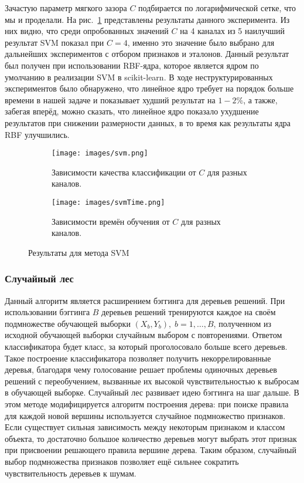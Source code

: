 Зачастую параметр мягкого зазора \(C\) подбирается по логарифмической сетке, что мы и проделали. На рис.~\ref{fig:svm-base} представлены результаты данного эксперимента. Из них видно, что среди опробованных значений \(C\) на 4 каналах из 5 наилучший результат SVM показал при \(C=4\), именно это значение было выбрано для дальнейших экспериментов с отбором признаков и эталонов. Данный результат был получен при использовании RBF-ядра, которое является ядром по умолчанию в реализации SVM в scikit-learn. В ходе неструктурированных экспериментов было обнаружено, что линейное ядро требует на порядок больше времени в нашей задаче и показывает худший результат на \(1-2\%\), а также, забегая вперёд, можно сказать, что линейное ядро показало ухудшение результатов при снижении размерности данных, в то время как результаты ядра RBF улучшились.

\begin{figure}[h!]
    \centering
	\begin{subfigure}{0.45\textwidth}
		\texttt{[image: images/svm.png]}
		\caption{Зависимости качества классификации от \(C\) для разных каналов.}
	\end{subfigure}
	\begin{subfigure}{0.45\textwidth}
		\texttt{[image: images/svmTime.png]}
		\caption{Зависимости времён обучения от \(C\) для разных каналов.}
	\end{subfigure}
	\caption{Результаты для метода SVM}\label{fig:svm-base}
\end{figure}

\subsubsection{Случайный лес}
Данный алгоритм является расширением бэггинга для деревьев решений. При использовании бэггинга \(B\) деревьев решений тренируются каждое на своём подмножестве обучающей выборки \(\left(X_b, Y_b\right),\;b=1,\dotsc,B\), полученном из исходной обучающей выборки случайным выбором с повторениями. Ответом классификатора будет класс, за который проголосовало больше всего деревьев. Такое построение классификатора позволяет получить некоррелированные деревья, благодаря чему голосование решает проблемы одиночных деревьев решений с переобучением, вызванные их высокой чувствительностью к выбросам в обучающей выборке. Случайный лес развивает идею бэггинга на шаг дальше. В этом методе модифицируется алгоритм построения дерева: при поиске правила для каждой новой вершины используется случайное подмножество признаков. Если существует сильная зависимость между некоторым признаком и классом объекта, то достаточно большое количество деревьев могут выбрать этот признак при присвоении решающего правила вершине дерева. Таким образом, случайный выбор подмножества признаков позволяет ещё сильнее сократить чувствительность деревьев к шумам.

